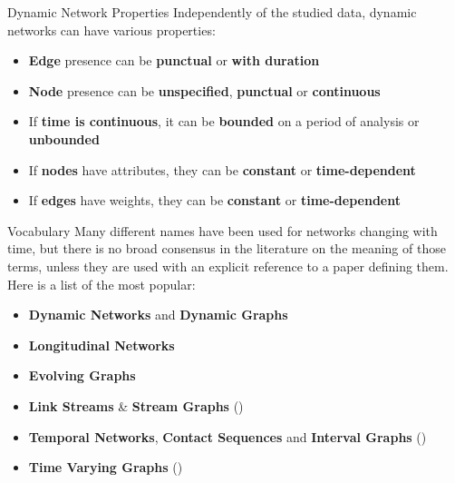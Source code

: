 \begin{textbox}{Dynamic Network Properties}
    Independently of the studied data, dynamic networks can have various properties:
    \begin{itemize}
        \item \textbf{Edge} presence can be \textbf{punctual} or \textbf{with duration}
        \item \textbf{Node} presence can be \textbf{unspecified}, \textbf{punctual} or \textbf{continuous}
        \item If \textbf{time is continuous}, it can be \textbf{bounded} on a period of analysis or \textbf{unbounded}
        \item If \textbf{nodes} have attributes, they can be \textbf{constant} or \textbf{time-dependent}
        \item If \textbf{edges} have weights, they can be \textbf{constant} or \textbf{time-dependent}
    \end{itemize}
\end{textbox}

\begin{textbox}{Vocabulary}
    Many different names have been used for networks changing with time, but there is no broad consensus in the literature on the meaning of those terms, unless they are used with an explicit reference to a paper defining them. Here is a list of the most popular:
    \begin{itemize}
        \item \textbf{Dynamic Networks} and \textbf{Dynamic Graphs}
        \item \textbf{Longitudinal Networks}
        \item \textbf{Evolving Graphs}
        \item \textbf{Link Streams} \& \textbf{Stream Graphs} (\cite{latapy2018stream})
        \item \textbf{Temporal Networks}, \textbf{Contact Sequences} and \textbf{Interval Graphs} (\cite{holme2012temporal})
        \item \textbf{Time Varying Graphs} (\cite{casteigts2012time})
    \end{itemize}
\end{textbox}

